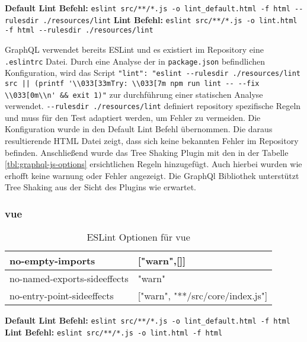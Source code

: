 \begin{center}
\textbf{Default Lint Befehl:} \lstinline{eslint src/**/*.js -o lint_default.html -f html --rulesdir ./resources/lint}\linebreak 
\textbf{Lint Befehl:} \lstinline{eslint src/**/*.js -o lint.html -f html --rulesdir ./resources/lint}
\end{center}

GraphQL verwendet bereits ESLint und es existiert im Repository eine \lstinline{.eslintrc} Datei. Durch eine Analyse der in \lstinline{package.json} befindlichen Konfiguration, wird das Script \lstinline{"lint": "eslint --rulesdir ./resources/lint src || (printf '\\033[33mTry: \\033[7m npm run lint -- --fix \\033[0m\\n' && exit 1)"} zur durchführung einer statischen Analyse verwendet. \lstinline{--rulesdir ./resources/lint} definiert repository spezifische Regeln und muss für den Test adaptiert werden, um Fehler zu vermeiden. Die Konfiguration wurde in den Default Lint Befehl übernommen. Die daraus resultierende HTML Datei zeigt, dass sich keine bekannten Fehler im Repository befinden. Anschließend wurde das Tree Shaking Plugin mit den in der Tabelle \ref{tbl:graphql-js-options} ersichtlichen Regeln hinzugefügt. Auch hierbei wurden wie erhofft keine warnung oder Fehler angezeigt. Die GraphQl Bibliothek unterstützt Tree Shaking aus der Sicht des Plugins wie erwartet.

\subsubsection{vue}
\begin{table}[H]
\centering
\caption{ESLint Optionen für vue}
\label{tbl:vue-options}
\begin{tabular}{|l|l|}
\hline
no-empty-imports             & {[}"warn",{[}{]}{]}         \\ \hline
no-named-exports-sideeffects & "warn"                      \\ \hline
no-entry-point-sideeffects   & {[}"warn", "**/src/core/index.js"{]} \\ \hline
\end{tabular}
\end{table}

\begin{center}
\textbf{Default Lint Befehl:} \lstinline{eslint src/**/*.js -o lint_default.html -f html}\linebreak 
\textbf{Lint Befehl:} \lstinline{eslint src/**/*.js -o lint.html -f html}
\end{center}

